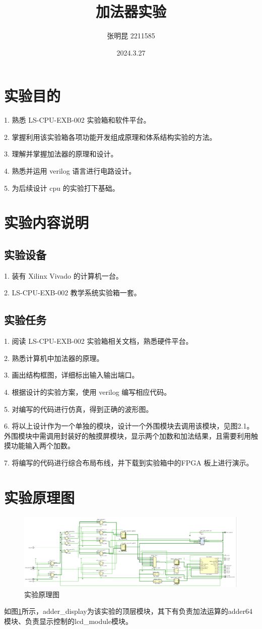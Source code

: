 \documentclass{ctexart}
\title{加法器实验}
\author{张明昆 2211585}
\date{2024.3.27}
\begin{document}
\maketitle
\tableofcontents
\section{实验目的}
1. 熟悉 LS-CPU-EXB-002 实验箱和软件平台。

2. 掌握利用该实验箱各项功能开发组成原理和体系结构实验的方法。

3. 理解并掌握加法器的原理和设计。

4. 熟悉并运用 verilog 语言进行电路设计。

5. 为后续设计 cpu 的实验打下基础。

\section{实验内容说明}
\subsection{实验设备}
1. 装有 Xilinx Vivado 的计算机一台。

2. LS-CPU-EXB-002 教学系统实验箱一套。
\subsection{实验任务}
1. 阅读 LS-CPU-EXB-002 实验箱相关文档，熟悉硬件平台。

2. 熟悉计算机中加法器的原理。

3. 画出结构框图，详细标出输入输出端口。

4. 根据设计的实验方案，使用 verilog 编写相应代码。

5. 对编写的代码进行仿真，得到正确的波形图。

6. 将以上设计作为一个单独的模块，设计一个外围模块去调用该模块，见图2.1。外围模块中需调用封装好的触摸屏模块，显示两个加数和加法结果，且需要利用触摸功能输入两个加数。

7. 将编写的代码进行综合布局布线，并下载到实验箱中的FPGA 板上进行演示。
\section{实验原理图}
\begin{figure}[ht]
    \centering
    \includegraphics[width=1\textwidth]{./figures/schematic_diagram.png}
    \caption{实验原理图}
    \label{schematic_diagram}
\end{figure}
如图\ref{schematic_diagram}所示，adder\_display为该实验的顶层模块，其下有负责加法运算的adder64模块、负责显示控制的lcd\_module模块。
\end{document}
